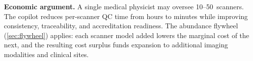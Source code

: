 \medskip
\noindent
\textbf{Economic argument.}
A single medical physicist may oversee 10--50~scanners.  The copilot
reduces per-scanner QC time from hours to minutes while improving
consistency, traceability, and accreditation readiness.  The abundance
flywheel (\cref{sec:flywheel}) applies: each scanner model added lowers
the marginal cost of the next, and the resulting cost surplus funds
expansion to additional imaging modalities and clinical sites.
